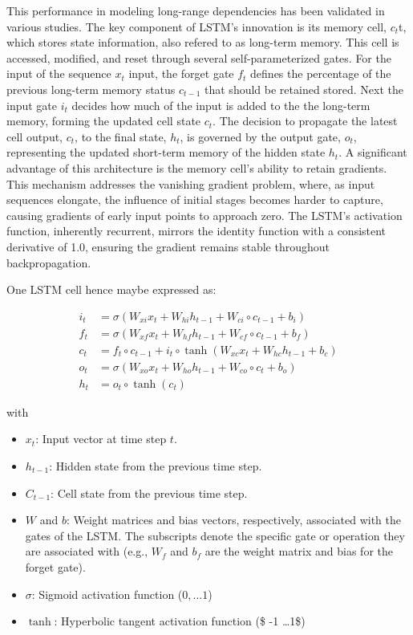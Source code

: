 \documentclass[
]{agujournal2019}
\providecommand{\tightlist}{%
  \setlength{\itemsep}{0pt}\setlength{\parskip}{0pt}}\usepackage{longtable,booktabs,array}
\begin{document}
This performance in modeling long-range dependencies has been validated
in various studies. The key component of LSTM's innovation is its memory
cell, \(c_t\)t, which stores state information, also refered to as
long-term memory. This cell is accessed, modified, and reset through
several self-parameterized gates. For the input of the sequence \(x_t\)
input, the forget gate \(f_t\) defines the percentage of the previous
long-term memory status \(c_{t-1}\) that should be retained
stored\hspace{0pt}. Next the input gate \(i_t\) decides how much of the
input is added to the the long-term memory, forming the updated cell
state \(c_{t}\). The decision to propagate the latest cell output,
\(c_t\), to the final state, \(h_t\), is governed by the output gate,
\(o_t\), representing the updated short-term memory of the hidden state
\(h_t\). A significant advantage of this architecture is the memory
cell's ability to retain gradients. This mechanism addresses the
vanishing gradient problem, where, as input sequences elongate, the
influence of initial stages becomes harder to capture, causing gradients
of early input points to approach zero. The LSTM's activation function,
inherently recurrent, mirrors the identity function with a consistent
derivative of 1.0, ensuring the gradient remains stable throughout
backpropagation.

One LSTM cell hence maybe expressed as:

\[
\begin{aligned}
i_t &= \sigma(W_{xi} x_t + W_{hi} h_{t-1} + W_{ci} \circ c_{t-1} + b_i) \\
f_t &= \sigma(W_{xf} x_t + W_{hf} h_{t-1} + W_{cf} \circ c_{t-1} + b_f) \\
c_t &= f_t \circ c_{t-1} + i_t \circ \tanh(W_{xc} x_t + W_{hc} h_{t-1} + b_c) \\
o_t &= \sigma(W_{xo} x_t + W_{ho} h_{t-1} + W_{co} \circ c_t + b_o) \\
h_t &= o_t \circ \tanh(c_t)
\end{aligned}
\]

with

\begin{itemize}
\tightlist
\item
  \(x_t\): Input vector at time step \(t\).
\item
  \(h_{t-1}\): Hidden state from the previous time step.
\item
  \(C_{t-1}\): Cell state from the previous time step.
\item
  \(W\) and \(b\): Weight matrices and bias vectors, respectively,
  associated with the gates of the LSTM. The subscripts denote the
  specific gate or operation they are associated with (e.g., \(W_f\) and
  \(b_f\) are the weight matrix and bias for the forget gate).
\item
  \(\sigma\): Sigmoid activation function (\(0,\ldots 1\))
\item
  \(\tanh\): Hyperbolic tangent activation function (\$ -1 \ldots 1\$)
\end{itemize}
\end{document}
